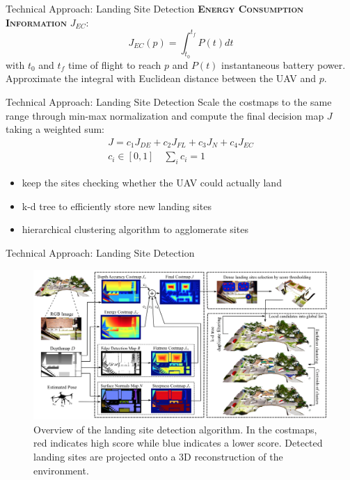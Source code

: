 \documentclass[10pt]{beamer}
\begin{document}
    \begin{frame}{Technical Approach: Landing Site Detection}
        \justifying
        \textbf{\textsc{Energy Consumption Information}} $J_{EC}$:
        \begin{equation*}
            J_{EC}(p) = \int_{t_0}^{t_f} P(t)dt
        \end{equation*}
        with $t_0$ and $t_f$ time of flight to reach $p$ and $P(t)$
        instantaneous battery power. Approximate the integral with Euclidean
        distance between the UAV and $p$.
    \end{frame}

    \begin{frame}{Technical Approach: Landing Site Detection}
        \justifying
        Scale the costmaps to the same range through min-max normalization
        and compute the final decision map $J$ taking a weighted sum:
        \begin{gather*}
            J = c_1 J_{DE} + c_2 J_{FL} + c_3 J_{N} + c_4 J_{EC} \\
            c_i \in [0, 1] \quad \sum_i c_i = 1
        \end{gather*}
        \vspace{-0.5cm}
        \begin{itemize}
            \item keep the sites checking whether the UAV could actually land
            \item k-d tree to efficiently store new landing sites
            \item hierarchical clustering algorithm to agglomerate sites
        \end{itemize}
    \end{frame}

    \begin{frame}{Technical Approach: Landing Site Detection}
        \begin{figure}
            \caption{
                \justifying
                Overview of the landing site detection algorithm. In
                the costmaps, red indicates high score while blue indicates
                a lower score. Detected landing sites are projected onto
                a 3D reconstruction of the environment.}
            \vspace{-0.3cm}
            \includegraphics[width=\textwidth]{images/Fig3.png}
        \end{figure}
    \end{frame}
\end{document}
